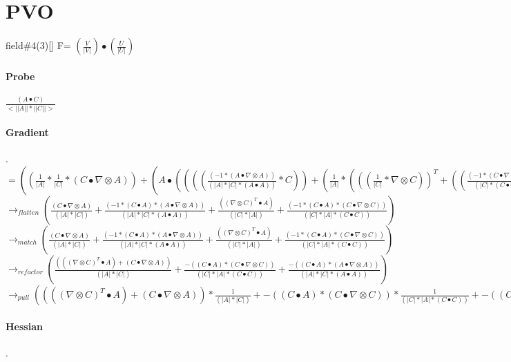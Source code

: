 \documentclass{article}
\begin{document}
\section{PVO}
field\#4(3)[] F= $(\frac{V}{|V|})\bullet(\frac{U}{|U|})$
\paragraph{Probe} $  \frac{(A \bullet C)}{<||A||*||C||>}$
\paragraph{Gradient}.\\
$= (( \frac{1}{|A|}* \frac{1}{|C|}*(C \bullet  \nabla  \otimes A))+(A \bullet (((( \frac{(-1*(A \bullet  \nabla  \otimes A))}{(|A|*|C|*(A \bullet A))}*C))+( \frac{1}{|A|}*((( \frac{1}{|C|}* \nabla  \otimes C))^T+(( \frac{(-1*(C \bullet  \nabla  \otimes C))}{(|C|*(C \bullet C))}*C))))))^T))$
 \\
\newline $\rightarrow_{flatten}( \frac{(C \bullet  \nabla  \otimes A)}{(|A|*|C|)}+ \frac{(-1*(C \bullet A)*(A \bullet  \nabla  \otimes A))}{(|A|*|C|*(A \bullet A))}+ \frac{(( \nabla  \otimes C)^T \bullet A)}{(|C|*|A|)}+ \frac{(-1*(C \bullet A)*(C \bullet  \nabla  \otimes C))}{(|C|*|A|*(C \bullet C))})$\\
\newline $\rightarrow_{match}( \frac{(C \bullet  \nabla  \otimes A)}{(|A|*|C|)}+ \frac{(-1*(C \bullet A)*(A \bullet  \nabla  \otimes A))}{(|A|*|C|*(A \bullet A))}+ \frac{(( \nabla  \otimes C)^T \bullet A)}{(|C|*|A|)}+ \frac{(-1*(C \bullet A)*(C \bullet  \nabla  \otimes C))}{(|C|*|A|*(C \bullet C))})$\\
\newline $\rightarrow_{refactor}( \frac{((( \nabla  \otimes C)^T \bullet A)+(C \bullet  \nabla  \otimes A))}{(|A|*|C|)}+ \frac{-{((C \bullet A)*(C \bullet  \nabla  \otimes C))}}{(|C|*|A|*(C \bullet C))}+ \frac{-{((C \bullet A)*(A \bullet  \nabla  \otimes A))}}{(|A|*|C|*(A \bullet A))})$\\
\newline $\rightarrow_{pull}(((( \nabla  \otimes C)^T \bullet A)+(C \bullet  \nabla  \otimes A))* \frac{1}{(|A|*|C|)}+-{((C \bullet A)*(C \bullet  \nabla  \otimes C))}* \frac{1}{(|C|*|A|*(C \bullet C))}+-{((C \bullet A)*(A \bullet  \nabla  \otimes A))}* \frac{1}{(|A|*|C|*(A \bullet A))})$



\paragraph{Hessian}.\\
\end{document}
